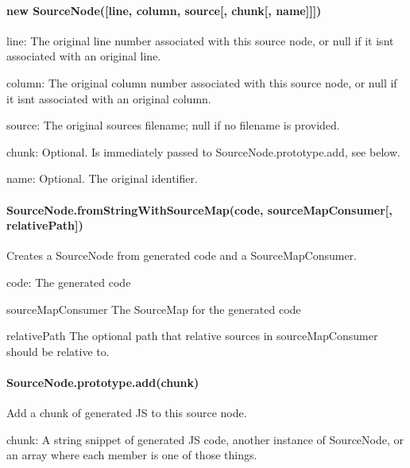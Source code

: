 \paragraph*{new Source\+Node(\mbox{[}line, column, source\mbox{[}, chunk\mbox{[}, name\mbox{]}\mbox{]}\mbox{]})}


\begin{DoxyItemize}
\item {\ttfamily line}\+: The original line number associated with this source node, or null if it isn\textquotesingle{}t associated with an original line.
\item {\ttfamily column}\+: The original column number associated with this source node, or null if it isn\textquotesingle{}t associated with an original column.
\item {\ttfamily source}\+: The original source\textquotesingle{}s filename; null if no filename is provided.
\item {\ttfamily chunk}\+: Optional. Is immediately passed to {\ttfamily Source\+Node.\+prototype.\+add}, see below.
\item {\ttfamily name}\+: Optional. The original identifier.
\end{DoxyItemize}

\paragraph*{Source\+Node.\+from\+String\+With\+Source\+Map(code, source\+Map\+Consumer\mbox{[}, relative\+Path\mbox{]})}

Creates a Source\+Node from generated code and a Source\+Map\+Consumer.


\begin{DoxyItemize}
\item {\ttfamily code}\+: The generated code
\item {\ttfamily source\+Map\+Consumer} The Source\+Map for the generated code
\item {\ttfamily relative\+Path} The optional path that relative sources in {\ttfamily source\+Map\+Consumer} should be relative to.
\end{DoxyItemize}

\paragraph*{Source\+Node.\+prototype.\+add(chunk)}

Add a chunk of generated J\+S to this source node.


\begin{DoxyItemize}
\item {\ttfamily chunk}\+: A string snippet of generated J\+S code, another instance of {\ttfamily Source\+Node}, or an array where each member is one of those things.
\end{DoxyItemize}


